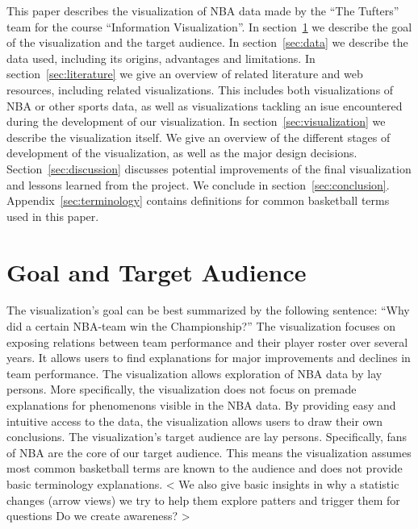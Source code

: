 \documentclass{sigchi}
\begin{document}
This paper describes the visualization of NBA data made by the ``The Tufters''
team for the course ``Information Visualization''. In section~\ref{sec:goal} we
describe the goal of the visualization and the target audience. In
section~\ref{sec:data} we describe the data used, including its origins,
advantages and limitations. In section~\ref{sec:literature} we give an overview
of related literature and web resources, including related visualizations.  This
includes both visualizations of NBA or other sports data, as well as
visualizations tackling an isue encountered during the development of our
visualization. In section~\ref{sec:visualization} we describe the visualization
itself. We give an overview of the different stages of development of the
visualization, as well as the major design decisions.
Section~\ref{sec:discussion} discusses potential improvements of the final
visualization and lessons learned from the project. We conclude in
section~\ref{sec:conclusion}. Appendix~\ref{sec:terminology} contains
definitions for common basketball terms used in this paper.

\section{Goal and Target Audience}\label{sec:goal} 
The visualization's goal can be best summarized by the following sentence: ``Why
did a certain NBA-team win the Championship?'' The visualization focuses on exposing relations between team
performance and their player roster over several years. It allows users to find
explanations for major improvements and declines in team performance.  The
visualization allows exploration of NBA data by lay persons.  More specifically,
the visualization does not focus on premade explanations for phenomenons
visible in the NBA data. By providing easy and intuitive access to the data, the
visualization allows users to draw their own conclusions. The visualization's
target audience are lay persons. Specifically, fans of NBA are the core of our
target audience. This means the visualization assumes most common basketball
terms are known to the audience and does not provide basic terminology
explanations. 
< We also give basic insights in why a statistic changes (arrow views)
we try to help them explore patters and trigger them for questions
Do we create awareness?
>
\end{document}

